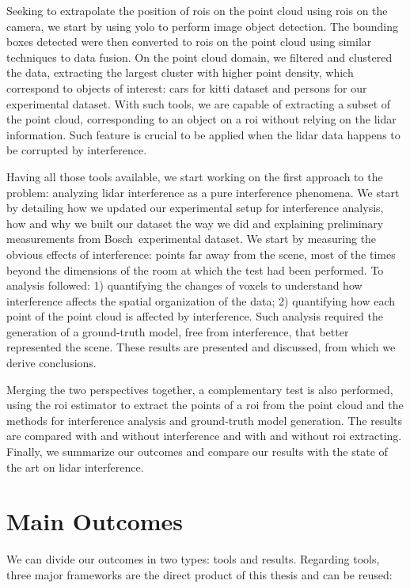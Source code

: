 Seeking to extrapolate the position of \acp{roi} on the point cloud using \acp{roi} on the camera, we start by using \ac{yolo} to perform image object detection. The bounding boxes detected were then converted to \acp{roi} on the point cloud using similar techniques to data fusion. On the point cloud domain, we filtered and clustered the data, extracting the largest cluster with higher point density, which correspond to objects of interest: cars for \ac{kitti} dataset and persons for our experimental dataset. With such tools, we are capable of extracting a subset of the point cloud, corresponding to an object on a \ac{roi} without relying on the \ac{lidar} information. Such feature is crucial to be applied when the \ac{lidar} data happens to be corrupted by interference.

Having all those tools available, we start working on the first approach to the problem: analyzing \ac{lidar} interference as a pure interference phenomena. We start by detailing how we updated our experimental setup for interference analysis, how and why we built our dataset the way we did and explaining preliminary measurements from Bosch\cp~experimental dataset. We start by measuring the obvious effects of interference: points far away from the scene, most of the times beyond the dimensions of the room at which the test had been performed. To analysis followed: 1) quantifying the changes of voxels to understand how interference affects the spatial organization of the data; 2) quantifying how each point of the point cloud is affected by interference. Such analysis required the generation of a ground-truth model, free from interference, that better represented the scene. These results are presented and discussed, from which we derive conclusions.

Merging the two perspectives together, a complementary test is also performed, using the \ac{roi} estimator to extract the points of a \ac{roi} from the point cloud and the methods for interference analysis and ground-truth model generation. The results are compared with and without interference and with and without \ac{roi} extracting. Finally, we summarize our outcomes and compare our results with the state of the art on \ac{lidar} interference.

\section{Main Outcomes}
\label{sec:conclusion:main-outcomes}
We can divide our outcomes in two types: tools and results. Regarding tools, three major frameworks are the direct product of this thesis and can be reused:

